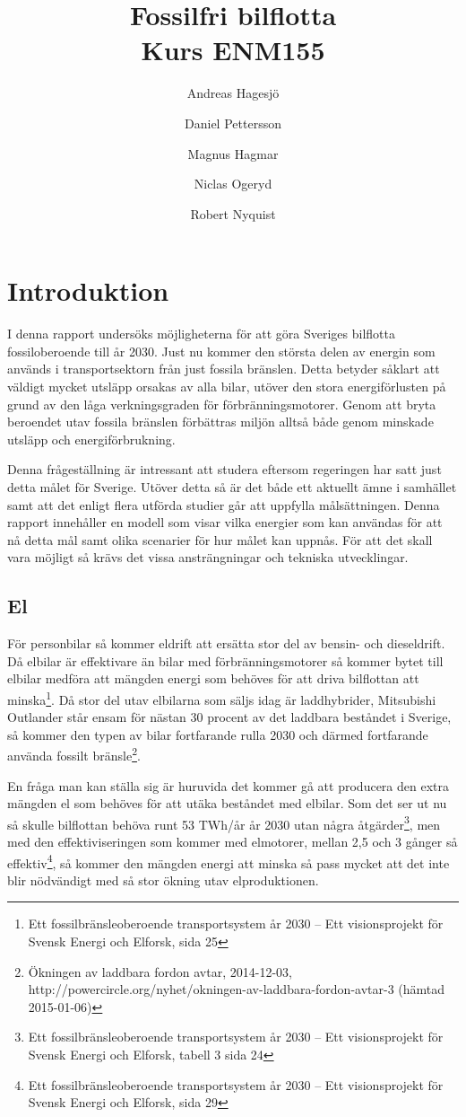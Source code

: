 \documentclass[a4paper,11pt,fleqn, titlepage]{article}
\author{Andreas Hagesjö \and Daniel Pettersson \and
Magnus Hagmar \and Niclas Ogeryd \and Robert Nyquist}
\title{Fossilfri bilflotta \\ Kurs ENM155}
\begin{document}
\maketitle

\section{Introduktion}
I denna rapport undersöks möjligheterna för att göra Sveriges bilflotta
fossiloberoende till år 2030. Just nu kommer den största delen av energin
som används i transportsektorn från just fossila bränslen. Detta betyder
såklart att väldigt mycket utsläpp orsakas av alla bilar, utöver den stora
energiförlusten på grund av den låga verkningsgraden för
förbränningsmotorer. Genom att bryta beroendet utav fossila bränslen
förbättras miljön alltså både genom minskade utsläpp och energiförbrukning.

Denna frågeställning är intressant att studera eftersom regeringen har satt
just detta målet för Sverige. Utöver detta så är det både ett aktuellt ämne
i samhället samt att det enligt flera utförda studier går att uppfylla
målsättningen. Denna rapport innehåller en modell som visar vilka energier
som kan användas för att nå detta mål samt olika scenarier för hur målet
kan uppnås. För att det skall vara möjligt så krävs det vissa
ansträngningar och tekniska utvecklingar.

\subsection{El}

För personbilar så kommer eldrift att ersätta stor del av bensin- och
dieseldrift. Då elbilar är effektivare än bilar med förbränningsmotorer så
kommer bytet till elbilar medföra att mängden energi som behöves för att
driva bilflottan att minska\footnote{Ett fossilbränsleoberoende
transportsystem år 2030 – Ett visionsprojekt för Svensk Energi och Elforsk,
sida 25}. Då stor del utav elbilarna som säljs idag är laddhybrider,
Mitsubishi Outlander står ensam för nästan 30 procent av det laddbara
beståndet i Sverige, så kommer den typen av bilar fortfarande rulla 2030
och därmed fortfarande använda fossilt bränsle\footnote{Ökningen av
laddbara fordon avtar, 2014-12-03, \\
http://powercircle.org/nyhet/okningen-av-laddbara-fordon-avtar-3 (hämtad
2015-01-06)}.

En fråga man kan ställa sig är huruvida det kommer gå att producera den
extra mängden el som behöves för att utäka beståndet med elbilar. Som det
ser ut nu så skulle bilflottan behöva runt 53 TWh/år år 2030 utan några
åtgärder\footnote{Ett fossilbränsleoberoende transportsystem år 2030 – Ett
visionsprojekt för Svensk Energi och Elforsk, tabell 3 sida 24}, men med
den effektiviseringen som kommer med elmotorer, mellan 2,5 och 3 gånger så
effektiv\footnote{Ett fossilbränsleoberoende transportsystem år 2030 – Ett
visionsprojekt för Svensk Energi och Elforsk, sida 29}, så kommer den
mängden energi att minska så pass mycket att det inte blir nödvändigt med
så stor ökning utav elproduktionen.
\end{document}
